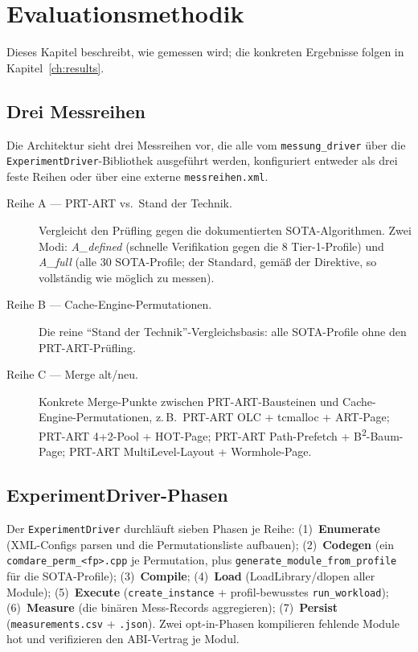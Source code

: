 \chapter{Evaluationsmethodik}\label{ch:methodology}

Dieses Kapitel beschreibt, wie gemessen wird; die konkreten Ergebnisse folgen in
Kapitel~\ref{ch:results}.

\section{Drei Messreihen}\label{sec:series}

Die Architektur sieht drei Messreihen vor, die alle vom \texttt{messung\_driver} über die
\texttt{ExperimentDriver}-Bibliothek ausgeführt werden, konfiguriert entweder als drei feste
Reihen oder über eine externe \texttt{messreihen.xml}.

\begin{description}
  \item[Reihe A --- PRT-ART vs.\ Stand der Technik.] Vergleicht den Prüfling gegen die
        dokumentierten SOTA-Algorithmen. Zwei Modi: \emph{A\_defined} (schnelle Verifikation
        gegen die 8 Tier-1-Profile) und \emph{A\_full} (alle 30 SOTA-Profile; der Standard,
        gemäß der Direktive, so vollständig wie möglich zu messen).
  \item[Reihe B --- Cache-Engine-Permutationen.] Die reine ``Stand der Technik''-Vergleichsbasis:
        alle SOTA-Profile ohne den PRT-ART-Prüfling.
  \item[Reihe C --- Merge alt/neu.] Konkrete Merge-Punkte zwischen PRT-ART-Bausteinen und
        Cache-Engine-Permutationen, z.\,B.\ PRT-ART OLC + tcmalloc + ART-Page; PRT-ART
        4+2-Pool + HOT-Page; PRT-ART Path-Prefetch + B\textsuperscript{2}-Baum-Page; PRT-ART
        MultiLevel-Layout + Wormhole-Page.
\end{description}

\section{ExperimentDriver-Phasen}\label{sec:experimentdriver}

Der \texttt{ExperimentDriver} durchläuft sieben Phasen je Reihe: (1)~\textbf{Enumerate}
(XML-Configs parsen und die Permutationsliste aufbauen); (2)~\textbf{Codegen} (ein
\texttt{comdare\_perm\_<fp>.cpp} je Permutation, plus
\texttt{generate\_module\_from\_profile} für die SOTA-Profile); (3)~\textbf{Compile};
(4)~\textbf{Load} (LoadLibrary/dlopen aller Module); (5)~\textbf{Execute}
(\texttt{create\_instance} + profil-bewusstes \texttt{run\_workload}); (6)~\textbf{Measure}
(die binären Mess-Records aggregieren); (7)~\textbf{Persist} (\texttt{measurements.csv} +
\texttt{.json}). Zwei opt-in-Phasen kompilieren fehlende Module hot und verifizieren den
ABI-Vertrag je Modul.


